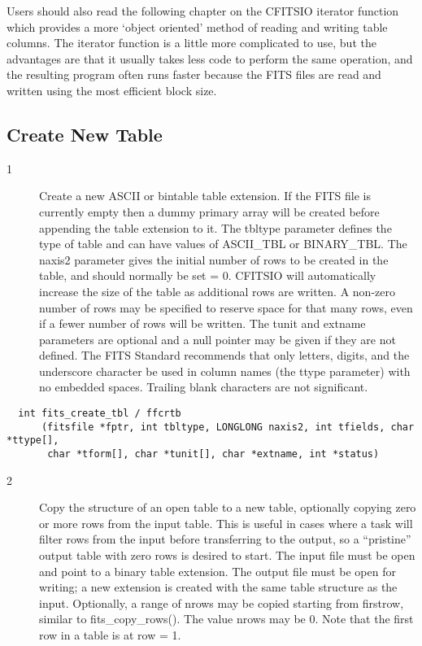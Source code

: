 \documentclass[11pt]{book}
\begin{document}
Users should also read the following chapter on the CFITSIO iterator
function which provides a more `object oriented' method of reading and
writing table columns.  The iterator function is a little more
complicated to use, but the advantages are that it usually takes less
code to perform the same operation, and the resulting program often
runs faster because the FITS files are read and written using the most
efficient block size.


\subsection{Create New Table}


\begin{description}
\item[1 ]Create a new ASCII or bintable table extension. If
   the FITS file is currently empty then a dummy primary array will be
   created before appending the table extension to it.  The tbltype
   parameter defines the type of table and can have values of
   ASCII\_TBL or BINARY\_TBL.  The naxis2 parameter gives the initial
   number of rows to be created in the table, and should normally be
   set = 0.  CFITSIO will automatically increase the size of the table
   as additional rows are written.  A non-zero number of rows may be
   specified to reserve space for that many rows, even if a fewer
   number of rows will be written.  The tunit and extname parameters
   are optional and a null pointer may be given if they are not
   defined.  The FITS Standard recommends that only letters, digits,
   and the underscore character be used in column names (the ttype
   parameter) with no embedded spaces.  Trailing blank characters are
   not significant.   \label{ffcrtb}
\end{description}

\begin{verbatim}
  int fits_create_tbl / ffcrtb
      (fitsfile *fptr, int tbltype, LONGLONG naxis2, int tfields, char *ttype[],
       char *tform[], char *tunit[], char *extname, int *status)
\end{verbatim}

\begin{description}
\item[2 ] Copy the structure of an open table to a new table, optionally
    copying zero or more rows from the input table.  This is useful in
    cases where a task will filter rows from the input before transferring
    to the output, so a ``pristine'' output table with zero rows is
    desired to start.  The input file must be open and point to a binary table
    extension.  The output file must be open for writing; a new
    extension is created with the same table structure as the input.
    Optionally, a range of nrows may be copied starting from firstrow,
    similar to fits\_copy\_rows(). The value nrows may be 0.  Note that
    the first row in a table is at row = 1.
   \label{ffcpht}
\end{description}
\end{document}
